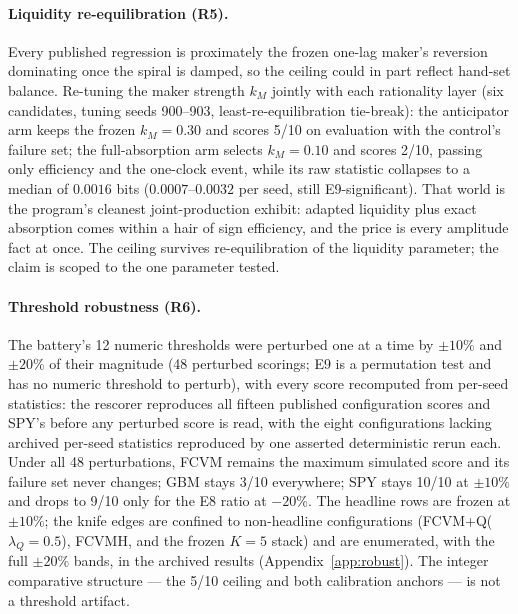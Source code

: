 \documentclass[11pt]{article}
\newcommand{\cfg}[1]{\mbox{#1}}
\begin{document}
\paragraph{Liquidity re-equilibration (R5).}
Every published regression is proximately the frozen one-lag maker's
reversion dominating once the spiral is damped, so the ceiling could in
part reflect hand-set balance. Re-tuning the maker strength $k_M$
jointly with each rationality layer (six candidates, tuning seeds
900--903, least-re-equilibration tie-break): the anticipator arm keeps
the frozen $k_M = 0.30$ and scores 5/10 on evaluation with the
control's failure set; the full-absorption arm selects $k_M = 0.10$ and
scores 2/10, passing only efficiency and the one-clock event, while its
raw statistic collapses to a median of $0.0016$ bits
($0.0007$--$0.0032$ per seed, still E9-significant). That world is the
program's cleanest joint-production exhibit: adapted liquidity plus
exact absorption comes within a hair of sign efficiency, and the price
is every amplitude fact at once. The ceiling survives re-equilibration
of the liquidity parameter; the claim is scoped to the one parameter
tested.

\paragraph{Threshold robustness (R6).}
The battery's 12 numeric thresholds were perturbed one at a time by
$\pm 10\%$ and $\pm 20\%$ of their magnitude (48 perturbed scorings; E9
is a permutation test and has no numeric threshold to perturb), with
every score recomputed from per-seed statistics: the rescorer reproduces
all fifteen published configuration scores and SPY's before any
perturbed score is read, with the eight configurations lacking archived
per-seed statistics reproduced by one asserted deterministic rerun each.
Under all 48 perturbations, \cfg{FCVM} remains the maximum simulated
score and its failure set never changes; GBM stays 3/10 everywhere; SPY
stays 10/10 at $\pm 10\%$ and drops to 9/10 only for the E8 ratio at
$-20\%$. The headline rows are frozen at $\pm 10\%$; the knife edges are
confined to non-headline configurations
(\cfg{FCVM+Q}($\lambda_Q{=}0.5$), \cfg{FCVMH}, and the frozen $K{=}5$
stack) and are enumerated, with the full $\pm 20\%$ bands, in the
archived results (Appendix~\ref{app:robust}). The integer comparative
structure --- the 5/10 ceiling and both calibration anchors --- is not a
threshold artifact.
\end{document}
